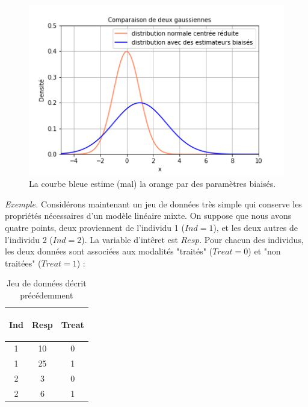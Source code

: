 \setcounter{figure}{0}
\begin{figure}[H]
\centering
\includegraphics[width = .7\textwidth]{normal_distribution.png}
\caption{La courbe bleue estime (mal) la orange par des paramètres biaisés.}
\end{figure}


\newpage

\emph{Exemple.} Considérons maintenant un jeu de données très simple qui conserve les propriétés nécessaires d'un modèle linéaire mixte. On suppose que nous avons quatre points, deux proviennent de l'individu 1 ($Ind = 1$), et les deux autres de l'individu 2 ($Ind = 2$). La variable d'intêret est $Resp$. Pour chacun des individus, les deux données sont associées aux modalités "traités" ($Treat = 0$) et "non traitées" ($Treat = 1$) : 

\vspace{4mm}

\begin{table}[h!]
        \centering
        \begin{tabular}{| c | c | c|}
        \hline
        \begin{bf} Ind \end{bf} &
        \begin{bf} Resp \end{bf} &
        \begin{bf} Treat \end{bf} \\
        \hline
        1 &  10 & 0\\
        1 & 25 & 1 \\
        2 & 3 & 0 \\
        2 &  6 & 1\\
        \hline
        \end{tabular}
\caption{Jeu de données décrit précédemment}
\end{table}

